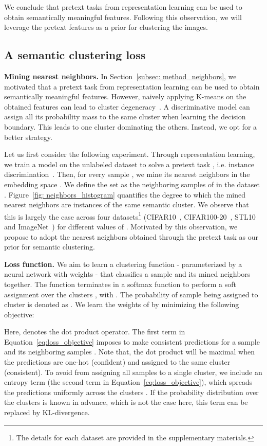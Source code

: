 \documentclass[runningheads]{llncs}
\begin{document}
We conclude that pretext tasks from representation learning can be used to obtain semantically meaningful features. Following this observation, we will leverage the pretext features as a prior for clustering the images. 

\subsection{A semantic clustering loss}
\label{subsec: method_loss}

\noindent\textbf{Mining nearest neighbors.} In Section~\ref{subsec: method_neighbors}, we motivated that a pretext task from representation learning can be used to obtain semantically meaningful features. However, naively applying K-means on the obtained features can lead to cluster degeneracy~\cite{DeepCluster}. A discriminative model can assign all its probability mass to the same cluster when learning the decision boundary. This leads to one cluster dominating the others. Instead, we opt for a better strategy.

Let us first consider the following experiment. Through representation learning, we train a model  on the unlabeled dataset  to solve a pretext task , i.e. instance discrimination~\cite{chen2020simple,he2019momentum}. Then, for every sample , we mine its  nearest neighbors in the embedding space . We define the set  as the neighboring samples of  in the dataset . Figure~\ref{fig: neighbors_histogram} quantifies the degree to which the mined nearest neighbors are instances of the same semantic cluster. We observe that this is largely the case across four datasets\footnote{The details for each dataset are provided in the supplementary materials.} (CIFAR10~\cite{CIFAR}, CIFAR100-20~\cite{CIFAR}, STL10~\cite{STL} and ImageNet~\cite{ImageNet}) for different values of . Motivated by this observation, we propose to adopt the nearest neighbors obtained through the pretext task  as our prior for semantic clustering.

\noindent\textbf{Loss function.} We aim to learn a clustering function  - parameterized by a neural network with weights  - that classifies a sample  and its mined neighbors  together. The function  terminates in a softmax function to perform a soft assignment over the clusters , with . The probability of sample  being assigned to cluster  is denoted as . We learn the weights of  by minimizing the following objective:


Here,  denotes the dot product operator. The first term in Equation~\ref{eq:loss_objective} imposes  to make consistent predictions for a sample  and its neighboring samples . Note that, the dot product will be maximal when the predictions are one-hot (confident) and assigned to the same cluster (consistent). To avoid  from assigning all samples to a single cluster, we include an entropy term (the second term in Equation~\ref{eq:loss_objective}), which spreads the predictions uniformly across the clusters . If the probability distribution over the clusters  is known in advance, which is not the case here, this term can be replaced by KL-divergence. 
\end{document}
